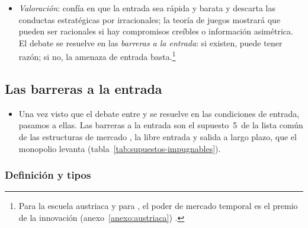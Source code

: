 \documentclass[11pt]{article}
\begin{document}
\begin{itemize}
  \begin{itemize}
  \item el criterio es el bienestar del consumidor;
  \item tolerancia con las concentraciones y las restricciones verticales;
  \item desregulación.
  \end{itemize}
\item \emph{Valoración}: confía en que la entrada sea rápida y barata y descarta las conductas estratégicas por irracionales; la teoría de juegos mostrará que pueden ser racionales si hay compromisos creíbles o información asimétrica. El debate se resuelve en las \emph{barreras a la entrada}: si existen,  puede tener razón; si no, la amenaza de entrada basta.\footnote{Para la escuela austriaca y para , el poder de mercado temporal es el premio de la innovación (anexo~\ref{anexo:austriaca}) .}
\end{itemize}

\subsection{Las barreras a la entrada}\label{sec:barreras}

\begin{itemize}
\item Una vez visto que el debate entre  y  se resuelve en las condiciones de entrada, pasamos a ellas. Las barreras a la entrada son el supuesto~5~de la lista común de las estructuras de mercado , la libre entrada y salida a largo plazo, que el monopolio levanta  (tabla~\ref{tab:supuestos-impugnables}).
\end{itemize}

\subsubsection{Definición y tipos}\label{sec:barreras-tipos}
\end{document}
